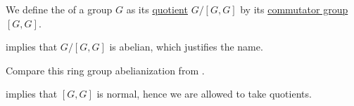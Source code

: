 \begin{definition}\label{def:group_abelianization}
   We define the  of a group \( G \) as its \hyperref[def:group/quotient]{quotient} \( G / [G, G] \) by its \hyperref[def:group_commutator]{commutator group} \( [G, G] \).
\end{definition}
\begin{comments}
  \item {} implies that \( G / [G, G] \) is abelian, which justifies the name.
  \item Compare this ring group abelianization from .
\end{comments}
\begin{defproof}
   implies that \( [G, G] \) is normal, hence we are allowed to take quotients.
\end{defproof}

